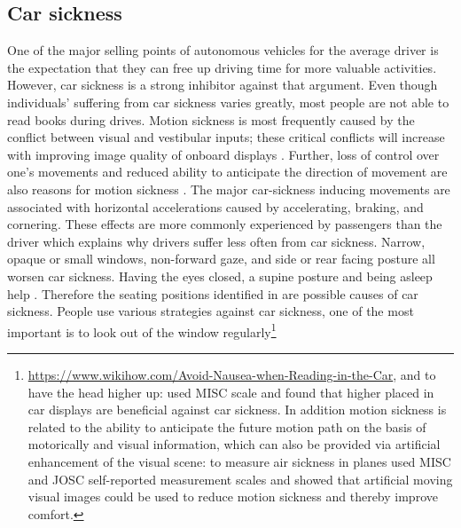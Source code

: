 \subsection{Car sickness}
\label{ssec:carsickness}
One of the major selling points of autonomous vehicles for the average driver is the expectation that they can free up driving time for more valuable activities. However, car sickness is a strong inhibitor against that argument. Even though individuals' suffering from car sickness varies greatly, most people are not able to read books during drives. Motion sickness is most frequently caused by the conflict between visual and vestibular inputs; these critical conflicts will increase with improving image quality of onboard displays \cite{Diels2016}.
Further, loss of control over one’s movements and reduced ability to anticipate the direction of movement are also reasons for motion sickness \cite{Sivak2015}. The major car-sickness inducing movements are associated with horizontal accelerations caused by accelerating, braking, and cornering\cite{Diels2016}. These effects are more commonly experienced by passengers than the driver which explains why drivers suffer less often from car sickness. Narrow, opaque or small windows, non-forward gaze, and side or rear facing posture all worsen car sickness. Having the eyes closed, a supine posture and being asleep help \cite{Sivak2015}. Therefore the seating positions identified in  are possible causes of car sickness. People use various strategies against car sickness, one of the most important is to look out of the window regularly\footnote{\url{https://www.wikihow.com/Avoid-Nausea-when-Reading-in-the-Car}, and to have the head higher up: \cite{Kuiper2018LookingCarsickness} used MISC scale and found that higher placed in car displays are beneficial against car sickness. In addition motion sickness is related to the ability to anticipate the future motion path on the basis of motorically and visual information, which can also be provided via artificial enhancement of the visual scene: to measure air sickness in planes \cite{Feenstra2011AAirsickness} used MISC and JOSC self-reported measurement scales and showed that artificial moving visual images could be used to reduce motion sickness and thereby improve comfort.

}

